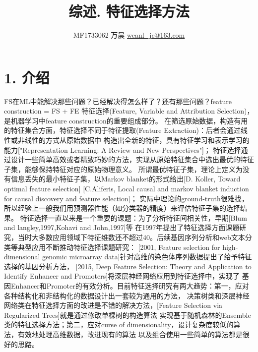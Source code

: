 \documentclass[a4paper,UTF8]{article}
\begin{document}
\title{综述. 特征选择方法}
\author{MF1733062 万晨 \url{weanl_jc@163.com}}
\maketitle

\section*{1. 介绍}
  FS在ML中能解决那些问题？已经解决得怎么样了？还有那些问题？feature construction = FS + FE
  特征选择(Feature, Variable and Attribution Selection)，是机器学习中feature construction的重要组成部分。
  在筛选原始数据，构造有用的特征集合方面，特征选择不同于特征提取(Feature Extraction)：后者会通过线性或非线性的方式从原始数据中
  构造出全新的特征，具有特征学习和表示学习的能力["Representation Learning: A Review and New Perspectives"]；
  特征选择通过设计一些简单高效或者精致巧妙的方法，实现从原始特征集合中选出最优的特征子集，能够保持特征对应的原始物理意义。
  所谓最优特征子集，理论上定义为没有信息丢失的最小特征子集，以Markov blanket的形式给出[D. Koller, Toward optimal feature selection]
  [C.Aliferis, Local causal and markov blanket induction for causal discovery and feature selection]；
  实际中理论的ground-truth很难找，所以经验上一般我们用预测器性能（如分类器的精度）来评估特征子集的选择结果。
  特征选择一直以来是一个重要的课题：为了分析特征间相关性，早期[Blum and langley,1997,Kohavi and John,1997]等
  在1997年提出了特征选择方面课题研究，当时大多数应用领域下特征维数还不超过40。后续基因序列分析和web文本分类等典型应用不断推动特征选择课题研究：
  [2001, Feature selection for high-dimensional genomic microarray data]针对高维的染色体序列数据提出了给予特征选择的基因分析方法，
  [2015, Deep Feature Selection: Theory and Application to Identify Enhancer and Promoters]将深层神经网络应用到特征选择中，实现了
  基因Enhancer和Promoter的有效分析。目前特征选择研究有两大趋势：第一，应对各种结构化和非结构化的数据设计出一套较为通用的方法，
  决策树类和深层神经网络类在特征选择方面的改进是不错的解决方法，[Feature Selection via Regularized Trees]就是通过修改单棵树的构造算法
  实现基于随机森林的Ensemble类的特征选择方法；第二，应对curse of dimensionality，设计复杂度较低的算法，有效地处理高维数据，改进现有的算法
  以及组合使用一些简单的算法都是很好的思路。
\end{document}
